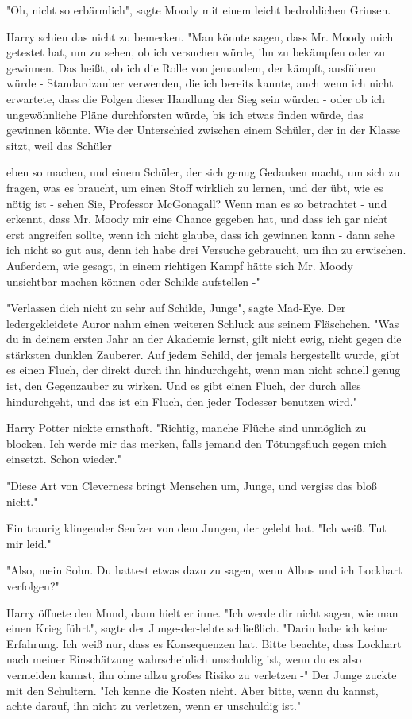 {"Oh, nicht so erbärmlich", sagte Moody mit einem leicht bedrohlichen Grinsen.

Harry schien das nicht zu bemerken. "Man könnte sagen, dass Mr. Moody mich getestet hat, um zu sehen, ob ich versuchen würde, ihn zu bekämpfen oder zu gewinnen. Das heißt, ob ich die Rolle von jemandem, der kämpft, ausführen würde - Standardzauber verwenden, die ich bereits kannte, auch wenn ich nicht erwartete, dass die Folgen dieser Handlung der Sieg sein würden - oder ob ich ungewöhnliche Pläne durchforsten würde, bis ich etwas finden würde, das gewinnen könnte. Wie der Unterschied zwischen einem Schüler, der in der Klasse sitzt, weil das Schüler

eben so machen, und einem Schüler, der sich genug Gedanken macht, um sich zu fragen, was es braucht, um einen Stoff wirklich zu lernen, und der übt, wie es nötig ist - sehen Sie, Professor McGonagall? Wenn man es so betrachtet - und erkennt, dass Mr. Moody mir eine Chance gegeben hat, und dass ich gar nicht erst angreifen sollte, wenn ich nicht glaube, dass ich gewinnen kann - dann sehe ich nicht so gut aus, denn ich habe drei Versuche gebraucht, um ihn zu erwischen. Außerdem, wie gesagt, in einem richtigen Kampf hätte sich Mr. Moody unsichtbar machen können oder Schilde aufstellen -"

"Verlassen dich nicht zu sehr auf Schilde, Junge", sagte Mad-Eye. Der ledergekleidete Auror nahm einen weiteren Schluck aus seinem Fläschchen. "Was du in deinem ersten Jahr an der Akademie lernst, gilt nicht ewig, nicht gegen die stärksten dunklen Zauberer. Auf jedem Schild, der jemals hergestellt wurde, gibt es einen Fluch, der direkt durch ihn hindurchgeht, wenn man nicht schnell genug ist, den Gegenzauber zu wirken. Und es gibt einen Fluch, der durch alles hindurchgeht, und das ist ein Fluch, den jeder Todesser benutzen wird."

Harry Potter nickte ernsthaft. "Richtig, manche Flüche sind unmöglich zu blocken. Ich werde mir das merken, falls jemand den Tötungsfluch gegen mich einsetzt. Schon wieder."

"Diese Art von Cleverness bringt Menschen um, Junge, und vergiss das bloß nicht."

Ein traurig klingender Seufzer von dem Jungen, der gelebt hat. "Ich weiß. Tut mir leid."

"Also, mein Sohn. Du hattest etwas dazu zu sagen, wenn Albus und ich Lockhart verfolgen?"

Harry öffnete den Mund, dann hielt er inne. "Ich werde dir nicht sagen, wie man einen Krieg führt", sagte der Junge-der-lebte schließlich. "Darin habe ich keine Erfahrung. Ich weiß nur, dass es Konsequenzen hat. Bitte beachte, dass Lockhart nach meiner Einschätzung wahrscheinlich unschuldig ist, wenn du es also vermeiden kannst, ihn ohne allzu großes Risiko zu verletzen -" Der Junge zuckte mit den Schultern. "Ich kenne die Kosten nicht. Aber bitte, wenn du kannst, achte darauf, ihn nicht zu verletzen, wenn er unschuldig ist."

}
